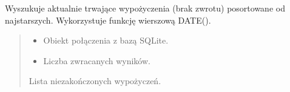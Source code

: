 \documentclass[a4paper,11pt,english,openany,oneside]{sphinxmanual}
\begin{document}
\begin{savenotes}\begin{fulllineitems}
\label{\detokenize{rozdzial_5/index:biblioteka_zapytania.get_najdluzej_przetrzymywane}}
\pysigstartsignatures
\pysiglinewithargsret
{}
{\sphinxparamcomma {}}
{}
\pysigstopsignatures
\sphinxAtStartPar
Wyszukuje aktualnie trwające wypożyczenia (brak zwrotu) posortowane od najstarszych.
Wykorzystuje funkcję wierszową DATE().

\sphinxAtStartPar
{}

\begin{sphinxVerbatim}[commandchars=\\\{\}]
\end{sphinxVerbatim}
\begin{quote}\begin{description}
\begin{itemize}
\item {} 
\sphinxAtStartPar
{} \textendash{} Obiekt połączenia z bazą SQLite.

\item {} 
\sphinxAtStartPar
{} \textendash{} Liczba zwracanych wyników.

\end{itemize}

\sphinxAtStartPar
Lista niezakończonych wypożyczeń.

\end{description}\end{quote}

\end{fulllineitems}\end{savenotes}
\end{document}
